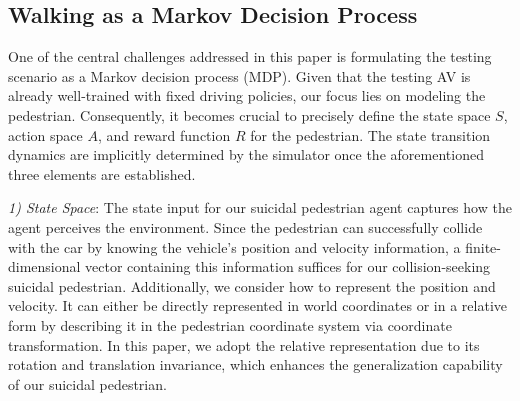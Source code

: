 \documentclass[letterpaper, 10 pt, conference]{ieeeconf}
\begin{document}





\subsection{Walking as a Markov Decision Process} \label{Method_Pedestrain_modeling}

One of the central challenges addressed in this paper is formulating the testing scenario as a Markov decision process (MDP). Given that the testing AV is already well-trained with fixed driving policies, our focus lies on modeling the pedestrian. Consequently, it becomes crucial to precisely define the state space $S$, action space $A$, and reward function $R$ for the pedestrian. The state transition dynamics are implicitly determined by the simulator once the aforementioned three elements are established.



\textit{1) State Space}: The state input for our suicidal pedestrian agent captures how the agent perceives the environment. Since the pedestrian can successfully collide with the car by knowing the vehicle's position and velocity information, a finite-dimensional vector containing this information suffices for our collision-seeking suicidal pedestrian. Additionally, we consider how to represent the position and velocity. It can either be directly represented in world coordinates 
or in a relative form by describing it in the pedestrian coordinate system via coordinate transformation. In this paper, we adopt the relative representation due to its rotation and translation invariance, which enhances the generalization capability of our suicidal pedestrian.
\end{document}

